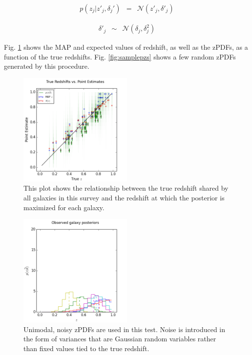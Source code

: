 \documentclass[preprint]{aastex}
\begin{document}
\begin{eqnarray}
\label{eq:zspread-noisy}
p(z_{j}|z'_{j},\delta_{j}') &=& \mathcal{N}(z'_{j},\delta'_{j})
\end{eqnarray}

\begin{eqnarray}
\label{eq:znoise}
\delta'_{j} &\sim& \mathcal{N}(\delta_{j},\delta^{2}_{j})
\end{eqnarray}

Fig. \ref{fig:noisycat} shows the MAP and expected values of redshift, as well 
as the zPDFs, as a function of the true redshifts.  Fig. \ref{fig:samplepzs} 
shows a few random zPDFs generated by this procedure.

\begin{figure}
\includegraphics[width=0.5\textwidth]{sigma/truevmap.png}
\caption{This plot shows the relationship between the true redshift shared by 
all galaxies in this survey and the redshift at which the posterior is 
maximized for each galaxy.}
\label{fig:noisycat}
\end{figure}

\begin{figure}
\includegraphics[width=0.5\textwidth]{sigma/samplepzs.png}
\caption{Unimodal, noisy zPDFs are used in this test.  Noise is introduced in 
the form of variances that are Gaussian random variables rather than fixed 
values tied to the true redshift.}
\label{fig:noisypzs}
\end{figure}
\end{document}

